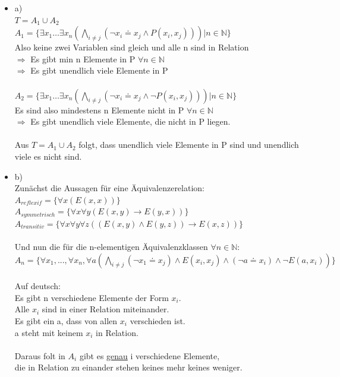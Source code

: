 \documentclass[a4paper]{scrartcl}
\begin{document}
    \begin{itemize}
        \item a)\\
            $T = A_1 \cup A_2$\\
            $A_1 = \{\exists x_1 \dots \exists x_n (\bigwedge_{i \neq j}(\neg x_i \doteq x_j \land P(x_i,x_j))) | n \in \mathds{N}\}$\\
            Also keine zwei Variablen sind gleich und alle n sind in Relation\\
            $\Rightarrow$ Es gibt min n Elemente in P $\forall n \in \mathds{N}$\\
            $\Rightarrow$ Es gibt unendlich viele Elemente in P\\
            \\$A_2 = \{\exists x_1 \dots \exists x_n (\bigwedge_{i \neq j}(\neg x_i \doteq x_j \land \neg P(x_i,x_j))) | n \in \mathds{N}\}$\\
            Es sind also mindestens n Elemente nicht in P $\forall n \in \mathds{N}$\\
            $\Rightarrow$ Es gibt unendlich viele Elemente, die nicht in P liegen.\\
            \\Aus $T = A_1 \cup A_2$ folgt, dass unendlich viele Elemente in P sind und unendlich viele es nicht sind.\\

        \item b)\\
            Zunächst die Aussagen für eine Äquivalenzerelation:\\
            $A_{reflexif} = \{\forall x (E(x,x))\}$\\
            $A_{symmetrisch} = \{\forall x \forall y (E(x,y) \rightarrow E(y,x))\}$\\
            $A_{transitiv} = \{\forall x \forall y \forall z ((E(x,y) \land E(y,z)) \rightarrow E(x,z))\}$\\
            \\Und nun die für die n-elementigen Äquivalenzklassen $\forall n \in \mathds{N}$:\\
            $A_n = \{\forall x_1,...,\forall x_n,\forall a (\bigwedge_{i \neq j} (\neg x_1 \doteq x_j)  \land E(x_i,x_j) \land (\neg a \doteq x_i) \land \neg E(a, x_i))\}$\\
            \\Auf deutsch:\\
            Es gibt n verschiedene Elemente der Form $x_i$.\\
            Alle $x_i$ sind in einer Relation miteinander.\\
            Es gibt ein a, dass von allen $x_i$ verschieden ist.\\
            a steht mit keinem $x_i$ in Relation.\\
            \\Daraus folt in $A_i$ gibt es \underline{genau} i verschiedene Elemente,
            \\die in Relation zu einander stehen keines mehr keines weniger.\\


\end{itemize}
\end{document}
